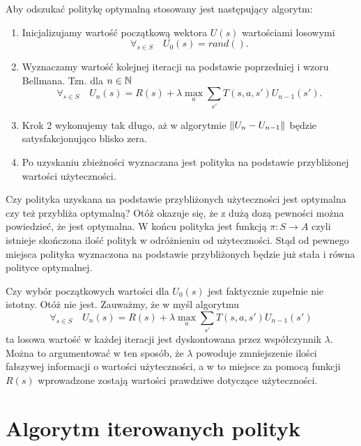 \documentclass[10pt,a4paper]{book}
\begin{document}
\begin{definition}
Aby odszukać politykę optymalną stosowany jest następujący algorytm:
\begin{enumerate}
\item Inicjalizujamy wartość początkową wektora $U(s)$ wartościami losowymi
$$
\forall_{s \in S} \quad U_0(s) = rand().
$$
\item Wyznaczamy wartość kolejnej iteracji na podstawie poprzedniej i wzoru Bellmana. Tzn. dla $n \in \mathbb{N}$ 
$$
\forall_{s \in S} \quad U_n(s) =  R(s) + \lambda \max_{a} \sum_{s'} T(s,a,s') U_{n-1}( s').
$$
\item Krok 2 wykonujemy tak długo, aż w algorytmie $\left\| {U_n - U_{n-1}} \right\|_{}$ będzie satysfakcjonująco blisko zera.
\item Po uzyskaniu zbieżności wyznaczana jest polityka na podstawie przybliżonej wartości użyteczności.
\end{enumerate}

\end{definition} 

\begin{remark*}
Czy polityka uzyskana na podstawie przybliżonych użyteczności jest optymalna czy też przybliża optymalną? Otóż okazuje się, że z dużą dozą pewności można powiedzieć, że jest optymalna. W końcu polityka jest funkcją $\pi : S \to A$ czyli istnieje skończona ilość polityk w odróżnieniu od użyteczności. Stąd od pewnego miejsca polityka wyznaczona na podstawie przybliżonych będzie już stała i równa polityce optymalnej.
\end{remark*}


\begin{remark*}
Czy wybór początkowych wartości dla $U_0(s)$ jest faktycznie zupełnie nie istotny. Otóż nie jest. Zauważmy, że w myśl algorytmu
$$
\forall_{s \in S} \quad U_n(s) =  R(s) + \lambda \max_{a} \sum_{s'} T(s,a,s') U_{n-1}( s')
$$
ta losowa wartość w każdej iteracji jest dyskontowana przez współczynnik $\lambda$. Można to argumentować w ten sposób, że $\lambda$ powoduje zmniejszenie ilości fałszywej informacji o wartości użyteczności, a w to miejsce za pomocą funkcji $R(s)$ wprowadzone zostają wartości prawdziwe dotyczące użyteczności.
\end{remark*}

\section{Algorytm iterowanych polityk}
\end{document}
